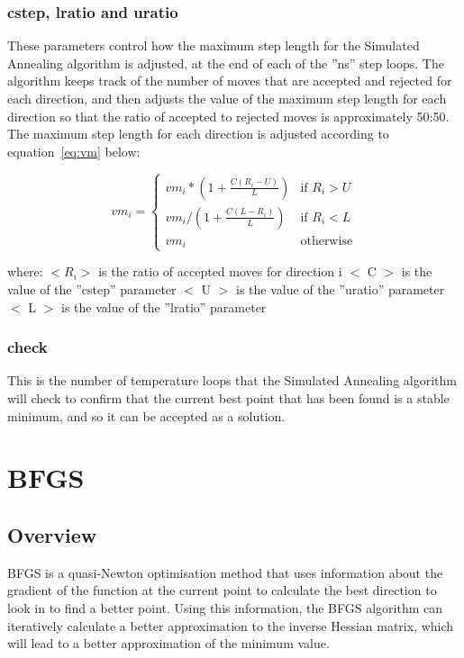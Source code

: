 \documentclass [a4paper, 10pt]{book}
\begin{document}
\subsubsection{cstep, lratio and uratio}
These parameters control how the maximum step length for the Simulated Annealing algorithm is adjusted, at the end of each of the ''ns'' step loops.  The algorithm keeps track of the number of moves that are accepted and rejected for each direction, and then adjusts the value of the maximum step length for each direction so that the ratio of accepted to rejected moves is approximately 50:50.  The maximum step length for each direction is adjusted according to equation~\ref{eq:vm} below:

\begin{equation}\label{eq:vm}
vm_{i} =
\begin{cases}
vm_{i} * (1 + \frac{C (R_{i} - U)}{L}) & \textrm{if $R_{i} > U$} \\
vm_{i} / (1 + \frac{C (L - R_{i})}{L}) & \textrm{if $R_{i} < L$} \\
vm_{i} & \textrm{otherwise}
\end{cases}
\end{equation}

where:\newline
$< R_{i} >$ is the ratio of accepted moves for direction i\newline
$<$ C $>$ is the value of the ''cstep'' parameter\newline
$<$ U $>$ is the value of the ''uratio'' parameter\newline
$<$ L $>$ is the value of the ''lratio'' parameter

\subsubsection{check}
This is the number of temperature loops that the Simulated Annealing algorithm will check to confirm that the current best point that has been found is a stable minimum, and so it can be accepted as a solution.

\section{BFGS}\label{sec:bfgs}
\subsection{Overview}\label{subsec:bfgsover}
BFGS is a quasi-Newton optimisation method that uses information about the gradient of the function at the current point to calculate the best direction to look in to find a better point.  Using this information, the BFGS algorithm can iteratively calculate a better approximation to the inverse Hessian matrix, which will lead to a better approximation of the minimum value.
\end{document}
